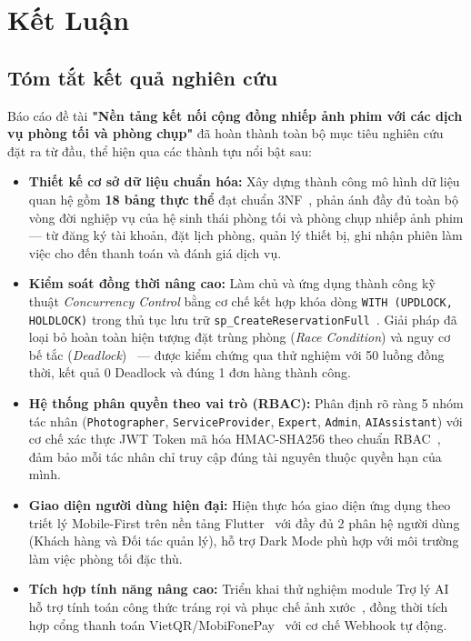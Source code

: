 \chapter*{Kết Luận}

\section*{Tóm tắt kết quả nghiên cứu}

Báo cáo đề tài \textbf{"Nền tảng kết nối cộng đồng nhiếp ảnh phim với các dịch vụ phòng tối và phòng chụp"} đã hoàn thành toàn bộ mục tiêu nghiên cứu đặt ra từ đầu, thể hiện qua các thành tựu nổi bật sau:

\begin{itemize}[leftmargin=2em]
    \item \textbf{Thiết kế cơ sở dữ liệu chuẩn hóa:} Xây dựng thành công mô hình dữ liệu quan hệ gồm \textbf{18 bảng thực thể} đạt chuẩn 3NF~\cite{silberschatz2020database}, phản ánh đầy đủ toàn bộ vòng đời nghiệp vụ của hệ sinh thái phòng tối và phòng chụp nhiếp ảnh phim — từ đăng ký tài khoản, đặt lịch phòng, quản lý thiết bị, ghi nhận phiên làm việc cho đến thanh toán và đánh giá dịch vụ.

    \item \textbf{Kiểm soát đồng thời nâng cao:} Làm chủ và ứng dụng thành công kỹ thuật \textit{Concurrency Control} bằng cơ chế kết hợp khóa dòng \texttt{WITH (UPDLOCK, HOLDLOCK)} trong thủ tục lưu trữ \texttt{sp\_CreateReservationFull}~\cite{microsoft2024locking}. Giải pháp đã loại bỏ hoàn toàn hiện tượng đặt trùng phòng (\textit{Race Condition}) và nguy cơ bế tắc (\textit{Deadlock})~\cite{habibi2024towards, zhang2023adaptive} — được kiểm chứng qua thử nghiệm với 50 luồng đồng thời, kết quả 0 Deadlock và đúng 1 đơn hàng thành công.

    \item \textbf{Hệ thống phân quyền theo vai trò (RBAC):} Phân định rõ ràng 5 nhóm tác nhân (\texttt{Photographer}, \texttt{ServiceProvider}, \texttt{Expert}, \texttt{Admin}, \texttt{AIAssistant}) với cơ chế xác thực JWT Token mã hóa HMAC-SHA256 theo chuẩn RBAC~\cite{nugraha2023performance, sandhu2023role}, đảm bảo mỗi tác nhân chỉ truy cập đúng tài nguyên thuộc quyền hạn của mình.

    \item \textbf{Giao diện người dùng hiện đại:} Hiện thực hóa giao diện ứng dụng theo triết lý Mobile-First trên nền tảng Flutter~\cite{alzewairi2024critical} với đầy đủ 2 phân hệ người dùng (Khách hàng và Đối tác quản lý), hỗ trợ Dark Mode phù hợp với môi trường làm việc phòng tối đặc thù.

    \item \textbf{Tích hợp tính năng nâng cao:} Triển khai thử nghiệm module Trợ lý AI hỗ trợ tính toán công thức tráng rọi và phục chế ảnh xước~\cite{wan2023old, su2024deep}, đồng thời tích hợp cổng thanh toán VietQR/MobiFonePay~\cite{wicaksono2023utilizing, sbv2021vietqr} với cơ chế Webhook tự động.
\end{itemize}

